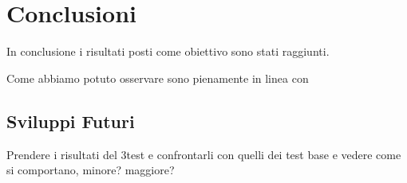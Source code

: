 \section{Conclusioni}
\label{section:conclusioni}

In conclusione i risultati posti come obiettivo sono stati raggiunti.



Come abbiamo potuto osservare sono pienamente in linea con 


\subsection{Sviluppi Futuri}


Prendere i risultati del 3\degree test e confrontarli con quelli dei test base e vedere come si comportano, minore? maggiore?